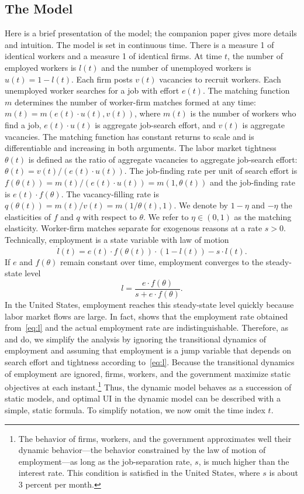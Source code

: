 \documentclass[letterpaper,12pt,leqno]{article}
\newcommand{\pre}[1]{\left( #1 \right)}
\def \t{{\theta}}
\begin{document}
\subsection{The Model}

Here is a brief presentation of the model; the companion paper gives more details and intuition. The model is set in continuous time. There is a measure 1 of identical workers and a measure 1 of identical firms. At time $t$, the number of employed workers is $l(t)$ and the number of unemployed workers is $u(t)=1-l(t)$. Each firm posts $v(t)$ vacancies to recruit workers. Each unemployed worker searches for a job with effort $e(t)$. The matching function $m$ determines the number of worker-firm matches formed at any time: $m(t)=m(e(t)\cdot u(t),v(t))$, where $m(t)$ is the number of workers who find a job, $e(t)\cdot u(t)$ is aggregate job-search effort, and $v(t)$ is aggregate vacancies. The matching function has constant returns to scale and is differentiable and increasing in both arguments. The labor market tightness $\t(t)$ is defined as the ratio of aggregate vacancies to aggregate job-search effort: $\t(t)=v(t)/(e(t)\cdot u(t))$. The job-finding rate per unit of search effort is $f(\t(t))=  m(t)/(e(t)\cdot u(t))= m(1,\t(t))$ and the job-finding rate is $e(t)\cdot f(\t)$. The vacancy-filling rate is $q(\t(t))=m(t)/v(t) = m\pre{1/\t(t),1}$. We denote by $1-\eta$ and $-\eta$ the elasticities of $f$ and $q$ with respect to $\t$. We refer to $\eta\in(0,1)$ as the matching elasticity. Worker-firm matches separate for exogenous reasons at a rate $s>0$. Technically, employment is a state variable with law of motion 
\begin{equation*}
\dot{l}(t)=e(t)\cdot f(\t(t))\cdot (1-l(t))-s\cdot l(t).
\end{equation*} 
If $e$ and $f(\t)$ remain constant over time, employment converges to the steady-state level  
\begin{equation}
l=\frac{e\cdot f(\t)}{s+e\cdot f(\t)}.
\label{eq:l}\end{equation}
In the United States, employment reaches this steady-state level quickly because labor market flows are large. In fact, \citet[Figure~1]{Ha05} shows that the employment rate obtained from~\eqref{eq:l} and the actual employment rate are indistinguishable. Therefore, as \citet{H05} and \citet{P07} do, we simplify the analysis by ignoring the transitional dynamics of employment and assuming that employment is a jump variable that depends on search effort and tightness according to~\eqref{eq:l}. Because the transitional dynamics of employment are ignored, firms, workers, and the government maximize static objectives at each instant.\footnote{The behavior of firms, workers, and the government approximates well their dynamic behavior---the behavior constrained by the law of motion of employment---as long as the job-separation rate, $s$, is much higher than the interest rate. This condition is satisfied in the United States, where $s$ is about 3 percent per month.} Thus, the dynamic model behaves as a succession of static models, and optimal UI in the dynamic model can be described with a simple, static formula. To simplify notation, we now omit the time index $t$.
\end{document}
